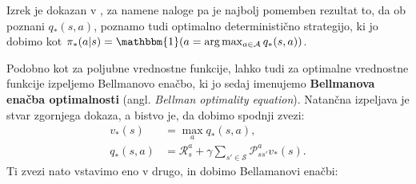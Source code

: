 \documentclass[12pt,a4paper]{amsart}
\theoremstyle{definition} %
\theoremstyle{plain} %
\begin{document}
%
%

Izrek je dokazan v \cite{RLalgo}, za namene naloge pa je najbolj pomemben rezultat to, da ob poznani 
$q_*(s, a)$, poznamo tudi optimalno deterministično strategijo, ki jo dobimo kot $\pi_*(a|s) = 
\mathbbm{1} (a =\text{arg}\max_{a \in \mathcal{A}} q_*(s, a))$.

Podobno kot za poljubne vrednostne funkcije, lahko tudi za optimalne vrednostne funkcije 
izpeljemo Bellmanovo enačbo, ki jo sedaj imenujemo \textbf{Bellmanova enačba optimalnosti} (angl. 
\textit{Bellman optimality equation}). Natančna izpeljava je stvar zgornjega dokaza, a bistvo je, 
da dobimo spodnji zvezi:
\begin{align*}
    v_*(s) &= \max_a q_*(s, a), \\
    q_*(s, a) &= \mathcal{R}_s^a + \gamma \sum_{s' \in \mathcal{S}} \mathcal{P}_{ss'}^a v_*(s).
\end{align*}
Ti zvezi nato vstavimo eno v drugo, in dobimo Bellamanovi enačbi: 
\end{document}
